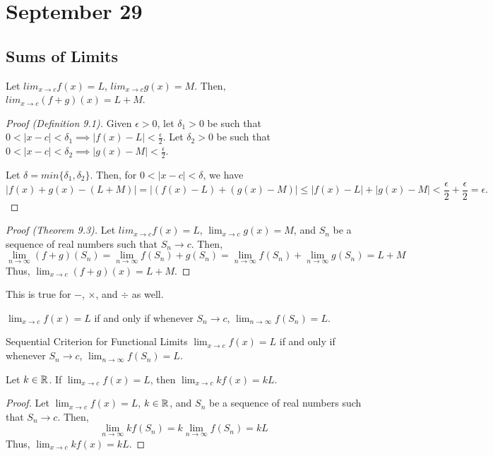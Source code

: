 \chapter{September 29}

\section{Sums of Limits}
\begin{theorem}{}{}
    Let $lim_{x \to c} f(x) = L$, $lim_{x \to c} g(x) = M$. Then, $lim_{x \to c} (f + g)(x) = L + M$.
\end{theorem}
\begin{proof}[Proof (Definition 9.1)]
    Given $\epsilon > 0$, let $\delta_1 > 0$ be such that $0 < |x - c| < \delta_1 \implies |f(x) - L| < \frac{\epsilon}{2}$. Let $\delta_2 > 0$ be such that $0 < |x - c| < \delta_2 \implies |g(x) - M| < \frac{\epsilon}{2}$.

    Let $\delta = min\{\delta_1, \delta_2\}$. Then, for $0 < |x - c| < \delta$, we have $$|f(x) + g(x) - (L + M)| = |(f(x) - L) + (g(x) - M)| \leq |f(x) - L| + |g(x) - M| < \frac{\epsilon}{2} + \frac{\epsilon}{2} = \epsilon.$$
\end{proof}
\begin{proof}[Proof (Theorem 9.3)]
    Let $lim_{x \to c} f(x) = L$, $\lim_{x \to c} g(x) = M$, and $S_n$ be a sequence of real numbers such that $S_n \to c$. Then, $$\lim_{n \to \infty} (f + g)(S_n) = \lim_{n \to \infty} f(S_n) + g(S_n) = \lim_{n \to \infty} f(S_n) + \lim_{n \to \infty} g(S_n) = L + M$$ Thus, $\lim_{x \to c} (f + g)(x) = L + M$.
\end{proof}
\begin{note}
    This is true for $-$, $\times$, and $\div$ as well.
\end{note}

\begin{definition}
    $\lim_{x \to c} f(x) = L$ if and only if whenever $S_n \to c$, $\lim_{n \to \infty} f(S_n) = L$.
\end{definition}

\begin{definition}{Sequential Criterion for Functional Limits}{}
    $\lim_{x \to c} f(x) = L$ if and only if whenever $S_n \to c$, $\lim_{n \to \infty} f(S_n) = L$.
\end{definition}

\begin{theorem}{}{}
    Let $k \in \mathbb{R}$. If $\lim_{x \to c} f(x) = L$, then $\lim_{x \to c} kf(x) = kL$.
\end{theorem}
\begin{proof}
    Let $\lim_{x \to c} f(x) = L$, $k \in \mathbb{R}$, and $S_n$ be a sequence of real numbers such that $S_n \to c$. Then, $$\lim_{n \to \infty} kf(S_n) = k\lim_{n \to \infty} f(S_n) = kL$$ Thus, $\lim_{x \to c} kf(x) = kL$.
\end{proof}

